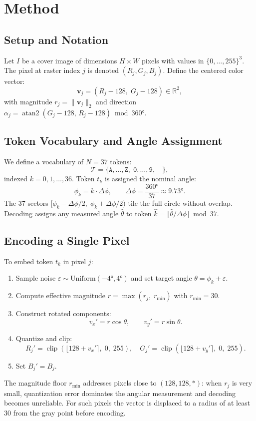 \documentclass[12pt]{article}
\begin{document}
\section{Method}
\label{sec:method}

\subsection{Setup and Notation}

Let $I$ be a cover image of dimensions $H \times W$ pixels with values in
$\{0,\ldots,255\}^3$. The pixel at raster index $j$ is denoted
$(R_j, G_j, B_j)$. Define the centered color vector:
\[
    \mathbf{v}_j = (R_j - 128,\; G_j - 128) \in \mathbb{R}^2,
\]
with magnitude $r_j = \|\mathbf{v}_j\|_2$ and direction
$\alpha_j = \operatorname{atan2}(G_j{-}128,\, R_j{-}128) \bmod 360°$.

\subsection{Token Vocabulary and Angle Assignment}

We define a vocabulary of $N = 37$ tokens:
\[
    \mathcal{T} = \{\texttt{A},\ldots,\texttt{Z},\;
                   \texttt{0},\ldots,\texttt{9},\;\texttt{ }\},
\]
indexed $k = 0, 1, \ldots, 36$. Token $t_k$ is assigned the nominal angle:
\[
    \phi_k = k \cdot \Delta\phi, \qquad
    \Delta\phi = \frac{360°}{37} \approx 9.73°.
\]
The 37 sectors $[\phi_k - \Delta\phi/2,\;\phi_k + \Delta\phi/2)$ tile the
full circle without overlap. Decoding assigns any measured angle $\hat\theta$
to token $\hat{k} = \lfloor \hat\theta/\Delta\phi \rceil \bmod 37$.

\subsection{Encoding a Single Pixel}
\label{subsec:encode}

To embed token $t_k$ in pixel $j$:
\begin{enumerate}
    \item Sample noise $\varepsilon \sim \mathrm{Uniform}(-4°, 4°)$ and
          set target angle $\theta = \phi_k + \varepsilon$.
    \item Compute effective magnitude
          $r = \max(r_j,\; r_{\min})$ with $r_{\min} = 30$.
    \item Construct rotated components:
          \[
              v_x' = r\cos\theta,\qquad v_y' = r\sin\theta.
          \]
    \item Quantize and clip:
          \[
              R_j' = \operatorname{clip}(\lfloor 128 + v_x' \rceil,\;0,\;255),\quad
              G_j' = \operatorname{clip}(\lfloor 128 + v_y' \rceil,\;0,\;255).
          \]
    \item Set $B_j' = B_j$.
\end{enumerate}
The magnitude floor $r_{\min}$ addresses pixels close to $(128,128,*)$:
when $r_j$ is very small, quantization error dominates the angular
measurement and decoding becomes unreliable. For such pixels the vector is
displaced to a radius of at least 30 from the gray point before encoding.
\end{document}
